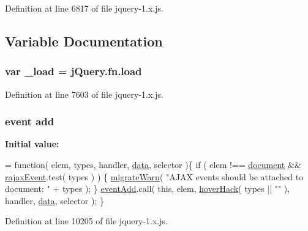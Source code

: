 Definition at line 6817 of file jquery-\/1.\+x.\+js.



\subsection{Variable Documentation}
\subsubsection[{\texorpdfstring{\+\_\+load}{_load}}]{\setlength{\rightskip}{0pt plus 5cm}var \+\_\+load = {\bf j\+Query.\+fn.\+load}}\hypertarget{jquery-1_8x_8js_ab9d9919a16b6ef96017991e55a3a9e6c}{}\label{jquery-1_8x_8js_ab9d9919a16b6ef96017991e55a3a9e6c}


Definition at line 7603 of file jquery-\/1.\+x.\+js.

\subsubsection[{\texorpdfstring{add}{add}}]{ event add}\hypertarget{jquery-1_8x_8js_a638fd10c6d2f5e258459b1abfa3b94ea}{}\label{jquery-1_8x_8js_a638fd10c6d2f5e258459b1abfa3b94ea}
{\bfseries Initial value\+:}
\begin{DoxyCode}
= \textcolor{keyword}{function}( elem, types, handler, \hyperlink{jquery-1_8x_8js_ad800f38c547e3a3ed2b14d23d10fc2b1}{data}, selector )\{
    \textcolor{keywordflow}{if} ( elem !== \hyperlink{classdocument}{document} && \hyperlink{jquery-1_8x_8js_a9c1dd76dd7323bf3aad84b78ea51b475}{rajaxEvent}.test( types ) ) \{
        \hyperlink{jquery-1_8x_8js_ac6036b3100bb484f96bfb15165e077f9}{migrateWarn}( \textcolor{stringliteral}{"AJAX events should be attached to document: "} + types );
    \}
    \hyperlink{jquery-1_8x_8js_a2ee2a279725f53d320bf9b116c5a179d}{eventAdd}.call( \textcolor{keyword}{this}, elem, \hyperlink{jquery-1_8x_8js_a645cef4bdf3fc1881c5272dacddb8917}{hoverHack}( types || \textcolor{stringliteral}{""} ), handler, 
      \hyperlink{jquery-1_8x_8js_ad800f38c547e3a3ed2b14d23d10fc2b1}{data}, selector );
\}
\end{DoxyCode}


Definition at line 10205 of file jquery-\/1.\+x.\+js.

